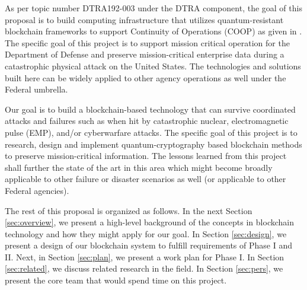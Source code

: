 As per topic number DTRA192-003 under the DTRA component, the goal of this proposal is to build computing infrastructure
that utilizes quantum-resistant blockchain frameworks to support Continuity of Operations (COOP) as given in
\cite{whitworth2006}. The specific goal of this project is to support mission critical operation for the Department of
Defense and preserve mission-critical enterprise data during a catastrophic physical attack on the United States. The
technologies and solutions built here can be widely applied to other agency operations as well under the Federal
umbrella. 

Our goal is to build a blockchain-based technology that can survive coordinated attacks and failures such as when
hit by catastrophic nuclear, electromagnetic pulse (EMP), and/or cyberwarfare attacks. The specific goal of this project
is to research, design and implement quantum-cryptography based blockchain methods to preserve mission-critical
information. The lessons learned from this project shall further the state of the art in this area which might become
broadly applicable to other failure or disaster scenarios as well (or applicable to other Federal agencies).

The rest of this proposal is organized as follows. In the next Section \ref{sec:overview}, we present a high-level
background of the concepts in blockchain technology and how they might apply for our goal. In Section \ref{sec:design},
we present a design of our blockchain system to fulfill requirements of Phase I and II. Next, in Section \ref{sec:plan},
we present a work plan for Phase I. In Section \ref{sec:related}, we discuss related research in the field.
In Section \ref{sec:pers}, we present the core team that would spend time on this project.

